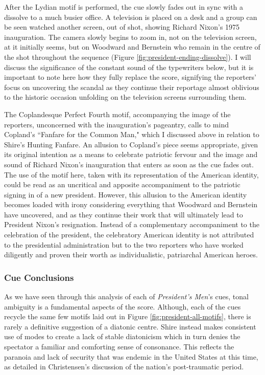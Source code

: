 After the Lydian motif is performed, the cue slowly fades out in sync with a dissolve to a much busier office.
A television is placed on a desk and a group can be seen watched another screen, out of shot, showing Richard Nixon's 1975 inauguration.
The camera slowly begins to zoom in, not on the television screen, at it initially seems, but on Woodward and Bernstein who remain in the centre of the shot throughout the sequence (Figure \ref{fig:president-ending-dissolve}).
I will discuss the significance of the constant sound of the typewriters below, but it is important to note here how they fully replace the score, signifying the reporters' focus on uncovering the scandal as they continue their reportage almost oblivious to the historic occasion unfolding on the television screens surrounding them. 

The Coplandesque Perfect Fourth motif, accompanying the image of the reporters, unconcerned with the inauguration's pageantry, calls to mind Copland's ``Fanfare for the Common Man," which I discussed above in relation to Shire's Hunting Fanfare.
An allusion to Copland's piece seems appropriate, given its original intention as a means to celebrate patriotic fervour and the image and sound of Richard Nixon's inauguration that enters as soon as the cue fades out.
The use of the motif here, taken with its representation of the American identity, could be read as an uncritical and apposite accompaniment to the patriotic signing in of a new president.
However, this allusion to the American identity becomes loaded with irony considering everything that Woodward and Bernstein have uncovered, and as they continue their work that will ultimately lead to President Nixon's resignation.
Instead of a complementary accompaniment to the celebration of the president, the celebratory American identity is not attributed to the presidential administration but to the two reporters who have worked diligently and proven their worth as individualistic, patriarchal American heroes.

 

\subsubsection{Cue Conclusions}

As we have seen through this analysis of each of \textit{President's Men}'s cues, tonal ambiguity is a fundamental aspects of the score.
Although, each of the cues recycle the same few motifs laid out in Figure \ref{fig:president-all-motifs}, there is rarely a definitive suggestion of a diatonic centre. 
Shire instead makes consistent use of modes to create a lack of stable diatonicism which in turn denies the spectator a familiar and comforting sense of consonance.
This reflects the paranoia and lack of security that was endemic in the United States at this time, as detailed in Christensen's discussion of the nation's post-traumatic period.

